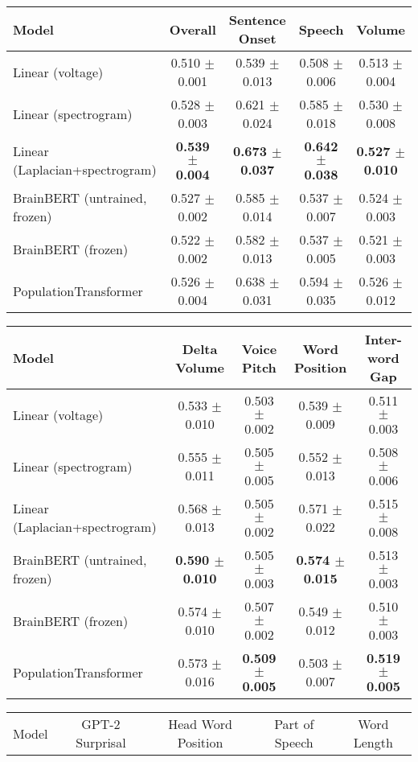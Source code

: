 \begin{table}[h]
\centering
\begin{tabular}{lcccc}
\hline
Model & Overall & Sentence Onset & Speech & Volume \\
\hline
Linear (voltage) & 0.510 $\pm$ 0.001 & 0.539 $\pm$ 0.013 & 0.508 $\pm$ 0.006 & 0.513 $\pm$ 0.004 \\
Linear (spectrogram) & 0.528 $\pm$ 0.003 & 0.621 $\pm$ 0.024 & 0.585 $\pm$ 0.018 & 0.530 $\pm$ 0.008 \\
Linear (Laplacian+spectrogram) & \textbf{0.539 $\pm$ 0.004} & \textbf{0.673 $\pm$ 0.037} & \textbf{0.642 $\pm$ 0.038} & \textbf{0.527 $\pm$ 0.010} \\
BrainBERT (untrained, frozen) & 0.527 $\pm$ 0.002 & 0.585 $\pm$ 0.014 & 0.537 $\pm$ 0.007 & 0.524 $\pm$ 0.003 \\
BrainBERT (frozen) & 0.522 $\pm$ 0.002 & 0.582 $\pm$ 0.013 & 0.537 $\pm$ 0.005 & 0.521 $\pm$ 0.003 \\
PopulationTransformer & 0.526 $\pm$ 0.004 & 0.638 $\pm$ 0.031 & 0.594 $\pm$ 0.035 & 0.526 $\pm$ 0.012 \\
\hline
\end{tabular}
\hspace{1em}
\begin{tabular}{lcccc}
\hline
Model & Delta Volume & Voice Pitch & Word Position & Inter-word Gap \\
\hline
Linear (voltage) & 0.533 $\pm$ 0.010 & 0.503 $\pm$ 0.002 & 0.539 $\pm$ 0.009 & 0.511 $\pm$ 0.003 \\
Linear (spectrogram) & 0.555 $\pm$ 0.011 & 0.505 $\pm$ 0.005 & 0.552 $\pm$ 0.013 & 0.508 $\pm$ 0.006 \\
Linear (Laplacian+spectrogram) & 0.568 $\pm$ 0.013 & 0.505 $\pm$ 0.002 & 0.571 $\pm$ 0.022 & 0.515 $\pm$ 0.008 \\
BrainBERT (untrained, frozen) & \textbf{0.590 $\pm$ 0.010} & 0.505 $\pm$ 0.003 & \textbf{0.574 $\pm$ 0.015} & 0.513 $\pm$ 0.003 \\
BrainBERT (frozen) & 0.574 $\pm$ 0.010 & 0.507 $\pm$ 0.002 & 0.549 $\pm$ 0.012 & 0.510 $\pm$ 0.003 \\
PopulationTransformer & 0.573 $\pm$ 0.016 & \textbf{0.509 $\pm$ 0.005} & 0.503 $\pm$ 0.007 & \textbf{0.519 $\pm$ 0.005} \\
\hline
\end{tabular}
\hspace{1em}
\begin{tabular}{lcccc}
\hline
Model & GPT-2 Surprisal & Head Word Position & Part of Speech & Word Length \\

\end{tabular}
\end{table}

